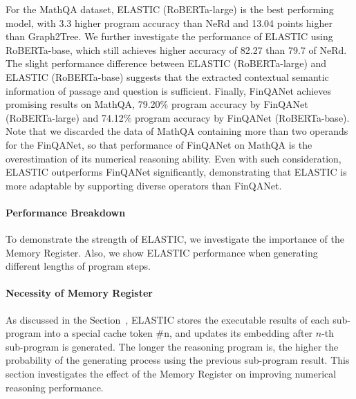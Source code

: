 \documentclass{article}
\begin{document}
For the MathQA dataset, ELASTIC (RoBERTa-large) is the best performing model, with 3.3 higher program accuracy than NeRd and 13.04 points higher than Graph2Tree. We further investigate the performance of ELASTIC using RoBERTa-base, which still achieves higher accuracy of 82.27 than 79.7 of NeRd. The slight performance difference between ELASTIC (RoBERTa-large) and ELASTIC (RoBERTa-base) suggests that the extracted contextual semantic information of passage and question is sufficient. Finally, FinQANet achieves promising results on MathQA, 79.20\% program accuracy by FinQANet (RoBERTa-large) and 74.12\% program accuracy by FinQANet (RoBERTa-base). Note that we discarded the data of MathQA containing more than two operands for the FinQANet, so that performance of FinQANet on MathQA is the overestimation of its numerical reasoning ability. Even with such consideration, ELASTIC outperforms FinQANet significantly, demonstrating that ELASTIC is more adaptable by supporting diverse operators than FinQANet.



\paragraph{Performance Breakdown}
To demonstrate the strength of ELASTIC, we investigate the importance of the Memory Register. Also, we show ELASTIC performance when generating different lengths of program steps.

\paragraph{Necessity of Memory Register}
\label{section: necessity of memory and updating mechanism}

As discussed in the Section~, ELASTIC stores the executable results of each sub-program into a special cache token \(\#\text{n}\), and updates its embedding after \(n\)-th sub-program is generated. The longer the reasoning program is, the higher the probability of the generating process using the previous sub-program result. This section investigates the effect of the Memory Register on improving numerical reasoning performance.
\end{document}
